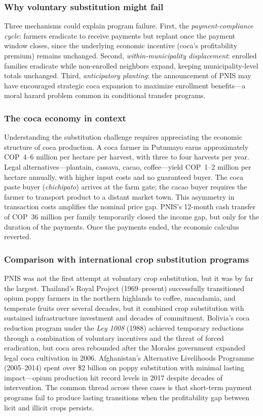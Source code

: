 \documentclass[12pt]{article}
\begin{document}
\subsubsection*{Why voluntary substitution might fail} Three mechanisms could explain program failure. First, the \emph{payment-compliance cycle}: farmers eradicate to receive payments but replant once the payment window closes, since the underlying economic incentive (coca's profitability premium) remains unchanged. Second, \emph{within-municipality displacement}: enrolled families eradicate while non-enrolled neighbors expand, keeping municipality-level totals unchanged. Third, \emph{anticipatory planting}: the announcement of PNIS may have encouraged strategic coca expansion to maximize enrollment benefits---a moral hazard problem common in conditional transfer programs.

\subsubsection*{The coca economy in context} Understanding the substitution challenge requires appreciating the economic structure of coca production. A coca farmer in Putumayo earns approximately COP~4--6 million per hectare per harvest, with three to four harvests per year. Legal alternatives---plantain, cassava, cacao, coffee---yield COP~1--2 million per hectare annually, with higher input costs and no guaranteed buyer. The coca paste buyer (\emph{chichipato}) arrives at the farm gate; the cacao buyer requires the farmer to transport product to a distant market town. This asymmetry in transaction costs amplifies the nominal price gap. PNIS's 12-month cash transfer of COP~36 million per family temporarily closed the income gap, but only for the duration of the payments. Once the payments ended, the economic calculus reverted.

\subsubsection*{Comparison with international crop substitution programs} PNIS was not the first attempt at voluntary crop substitution, but it was by far the largest. Thailand's Royal Project (1969--present) successfully transitioned opium poppy farmers in the northern highlands to coffee, macadamia, and temperate fruits over several decades, but it combined crop substitution with sustained infrastructure investment and decades of commitment. Bolivia's coca reduction program under the \emph{Ley 1008} (1988) achieved temporary reductions through a combination of voluntary incentives and the threat of forced eradication, but coca area rebounded after the Morales government expanded legal coca cultivation in 2006. Afghanistan's Alternative Livelihoods Programme (2005--2014) spent over \$2 billion on poppy substitution with minimal lasting impact---opium production hit record levels in 2017 despite decades of intervention. The common thread across these cases is that short-term payment programs fail to produce lasting transitions when the profitability gap between licit and illicit crops persists.
\end{document}

